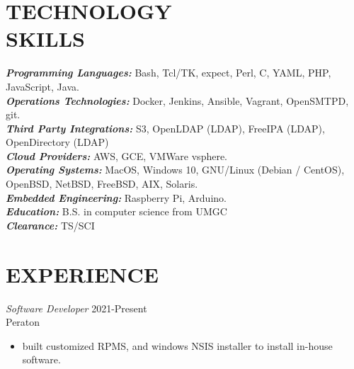 \documentclass[margin, 10pt]{res} %
\begin{document}
\begin{resume}


\section{TECHNOLOGY \\ SKILLS}

{\sl \textbf{Programming Languages:}} Bash, Tcl/TK, expect, Perl, C, YAML, PHP, JavaScript, Java. \\
{\sl \textbf{Operations Technologies:}} Docker, Jenkins, Ansible, Vagrant, OpenSMTPD, git. \\
{\sl \textbf{Third Party Integrations:}} S3, OpenLDAP (LDAP), FreeIPA (LDAP), OpenDirectory (LDAP) \\
{\sl \textbf{Cloud Providers:}} AWS, GCE, VMWare vsphere. \\
{\sl \textbf{Operating Systems:}} MacOS, Windows 10, GNU/Linux (Debian / CentOS), OpenBSD, NetBSD, FreeBSD, AIX, Solaris. \\
{\sl \textbf{Embedded Engineering:}} Raspberry Pi, Arduino. \\
{\sl \textbf{Education:}} B.S. in computer science from UMGC\\
{\sl \textbf{Clearance:}} TS/SCI \\


\section{EXPERIENCE}
{\sl Software Developer } \hfill 2021-Present \\
Peraton
\begin{itemize}
  \item built customized RPMS, and windows NSIS installer to install in-house software.
\end{itemize}


\end{resume}
\end{document}
